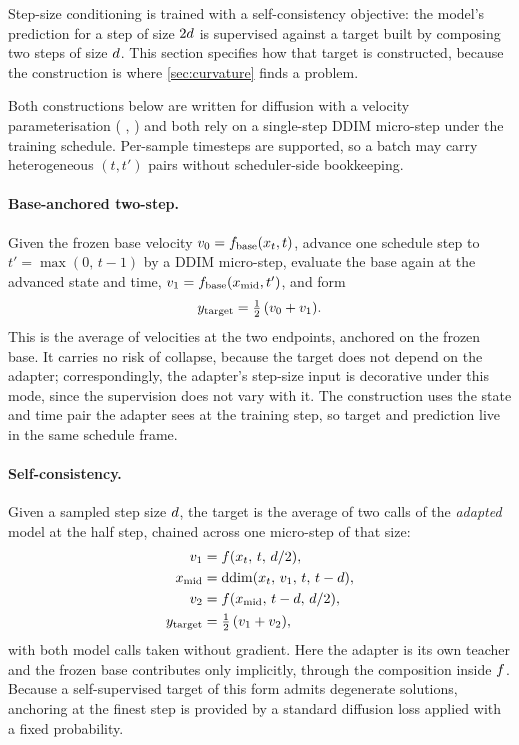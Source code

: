 Step-size conditioning is trained with a self-consistency objective: the
model's prediction for a step of size $2d$ is supervised against a
target built by composing two steps of size $d$. This section specifies
how that target is constructed, because the construction is where
\cref{sec:curvature} finds a problem.

Both constructions below are written for diffusion with a velocity
parameterisation ( ,
 ) and both rely on a single-step DDIM
micro-step under the training schedule. Per-sample timesteps are supported,
so a batch may carry heterogeneous $(t, t')$ pairs without scheduler-side
bookkeeping.

\paragraph{Base-anchored two-step.} Given the frozen base velocity
$v_0 = f_{\mathrm{base}}(x_t, t)$, advance one schedule step to
$t' = \max(0,\, t-1)$ by a DDIM micro-step, evaluate the base again at the
advanced state and time, $v_1 = f_{\mathrm{base}}(x_{\text{mid}}, t')$, and form
\begin{equation}
  \label{eq:base-anchored}
  y_{\text{target}} = \tfrac{1}{2}\,(v_0 + v_1).
\end{equation}
This is the average of velocities at the two endpoints, anchored on the
frozen base. It carries no risk of collapse, because the target does not
depend on the adapter; correspondingly, the adapter's step-size input is
decorative under this mode, since the supervision does not vary with it. The
construction uses the state and time pair the adapter sees at the training
step, so target and prediction live in the same schedule frame.

\paragraph{Self-consistency.} Given a sampled step size $d$, the target
is the average of two calls of the \emph{adapted} model at the half step,
chained across one micro-step of that size:
\begin{align}
  v_1 &= f(x_t,\, t,\, d/2), \nonumber \\
  x_{\text{mid}} &= \mathrm{ddim}(x_t,\, v_1,\, t,\, t-d), \nonumber \\
  v_2 &= f(x_{\text{mid}},\, t-d,\, d/2), \nonumber \\
  y_{\text{target}} &= \tfrac{1}{2}\,(v_1 + v_2),
  \label{eq:self-consistency}
\end{align}
with both model calls taken without gradient. Here the adapter is its own
teacher and the frozen base contributes only implicitly, through the
composition inside $f$. Because a self-supervised target of this
form admits degenerate solutions, anchoring at the finest step is provided
by a standard diffusion loss applied with a fixed probability.

